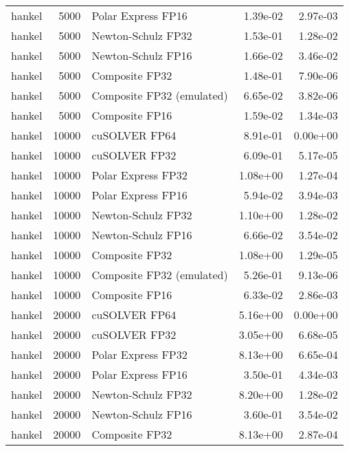 \begin{table}
\begin{tabular}{lrlrr}
   hankel &  5000 &        Polar Express FP16 &  1.39e-02 &        2.97e-03 \\
   hankel &  5000 &        Newton-Schulz FP32 &  1.53e-01 &        1.28e-02 \\
   hankel &  5000 &        Newton-Schulz FP16 &  1.66e-02 &        3.46e-02 \\
   hankel &  5000 &            Composite FP32 &  1.48e-01 &        7.90e-06 \\
   hankel &  5000 & Composite FP32 (emulated) &  6.65e-02 &        3.82e-06 \\
   hankel &  5000 &            Composite FP16 &  1.59e-02 &        1.34e-03 \\
   hankel & 10000 &             cuSOLVER FP64 &  8.91e-01 &        0.00e+00 \\
   hankel & 10000 &             cuSOLVER FP32 &  6.09e-01 &        5.17e-05 \\
   hankel & 10000 &        Polar Express FP32 &  1.08e+00 &        1.27e-04 \\
   hankel & 10000 &        Polar Express FP16 &  5.94e-02 &        3.94e-03 \\
   hankel & 10000 &        Newton-Schulz FP32 &  1.10e+00 &        1.28e-02 \\
   hankel & 10000 &        Newton-Schulz FP16 &  6.66e-02 &        3.54e-02 \\
   hankel & 10000 &            Composite FP32 &  1.08e+00 &        1.29e-05 \\
   hankel & 10000 & Composite FP32 (emulated) &  5.26e-01 &        9.13e-06 \\
   hankel & 10000 &            Composite FP16 &  6.33e-02 &        2.86e-03 \\
   hankel & 20000 &             cuSOLVER FP64 &  5.16e+00 &        0.00e+00 \\
   hankel & 20000 &             cuSOLVER FP32 &  3.05e+00 &        6.68e-05 \\
   hankel & 20000 &        Polar Express FP32 &  8.13e+00 &        6.65e-04 \\
   hankel & 20000 &        Polar Express FP16 &  3.50e-01 &        4.34e-03 \\
   hankel & 20000 &        Newton-Schulz FP32 &  8.20e+00 &        1.28e-02 \\
   hankel & 20000 &        Newton-Schulz FP16 &  3.60e-01 &        3.54e-02 \\
   hankel & 20000 &            Composite FP32 &  8.13e+00 &        2.87e-04 \\

\end{tabular}
\end{table}
